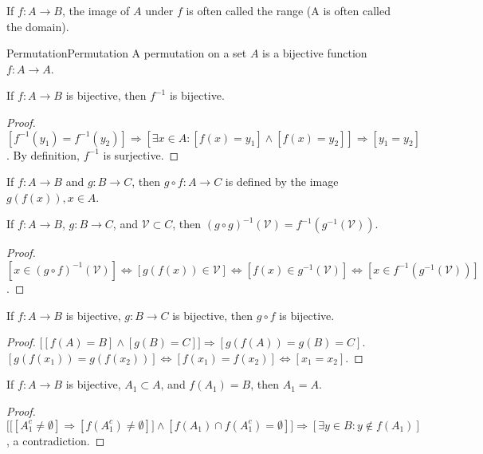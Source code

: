     If $f:A\rightarrow B$, the image of $A$ under $f$
    is often called the range (A is often called the domain).
    \begin{fdefinition}{Permutation}{Permutation}
        A \gls{permutation} on a \gls{set} $A$ is a \gls{bijective function}
        $f:A\rightarrow{A}$.
    \end{fdefinition}
    \begin{theorem}
    If $f:A\rightarrow B$ is bijective, then $f^{-1}$ is bijective.
    \end{theorem}
    \begin{proof}
    $[f^{-1}(y_1) = f^{-1}(y_2)]\Rightarrow [\exists x\in A:[f(x) = y_1]\land [f(x)=y_2]]\Rightarrow [y_1=y_2]$. By definition, $f^{-1}$ is surjective.
    \end{proof}
    \begin{definition}
    If $f:A\rightarrow B$ and $g:B\rightarrow C$, then $g\circ f:A\rightarrow C$ is defined by the image $g(f(x)), x\in A$. 
    \end{definition}
    \begin{theorem}
    If $f:A\rightarrow B$, $g:B\rightarrow C$, and $\mathcal{V}\subset C$, then $(g\circ g)^{-1}(\mathcal{V}) = f^{-1}(g^{-1}(\mathcal{V}))$.
    \end{theorem}
    \begin{proof}
    $[x\in (g\circ f)^{-1}(\mathcal{V})]\Leftrightarrow [g(f(x))\in \mathcal{V}] \Leftrightarrow [f(x)\in g^{-1}(\mathcal{V})]\Leftrightarrow [x\in f^{-1}(g^{-1}(\mathcal{V}))]$.
    \end{proof}
    \begin{theorem}
    If $f:A\rightarrow B$ is bijective, $g:B\rightarrow C$ is bijective, then $g\circ f$ is bijective.
    \end{theorem}
    \begin{proof}
    $\big[[f(A) = B]\land [g(B) = C]\big]\Rightarrow [g(f(A)) = g(B) = C]$. $[g(f(x_1))=g(f(x_2))]\Leftrightarrow [f(x_1)=f(x_2)]\Leftrightarrow [x_1=x_2]$.
    \end{proof}
    \begin{theorem}
    If $f:A\rightarrow B$ is bijective, $A_1\subset A$, and $f(A_1) = B$, then $A_1=A$.
    \end{theorem}
    \begin{proof}
    $\Big[\big[[A_1^c \ne \emptyset]\Rightarrow [f(A_1^c) \ne \emptyset]\big]\land[f(A_1)\cap f(A_1^c) = \emptyset]\Big]\Rightarrow [\exists y\in B:y\notin f(A_1)]$, a contradiction.
    \end{proof}